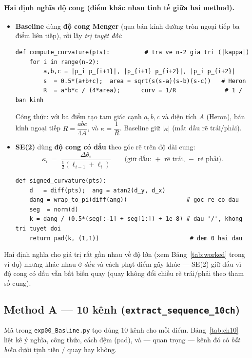 \documentclass[11pt]{article}
\newcommand{\code}[1]{\textcolor{cInk}{\texttt{#1}}}
\newcommand{\fileA}{\code{exp00\_Basline.py}}
\newcommand{\kk}{\kappa}
\theoremstyle{definition}
\newcommand{\chA}[1]{\textcolor{cA}{\textbf{#1}}}
\newcommand{\chB}[1]{\textcolor{cB}{\textbf{#1}}}
\begin{document}
\paragraph{Hai định nghĩa độ cong (điểm khác nhau tinh tế giữa hai method).}
\begin{itemize}[leftmargin=1.4em]
\item \chA{Baseline} dùng \textbf{độ cong Menger} (qua bán kính đường tròn ngoại
tiếp ba điểm liên tiếp), rồi lấy \emph{trị tuyệt đối}:
\begin{lstlisting}
def compute_curvature(pts):          # tra ve n-2 gia tri (|kappa|)
    for i in range(n-2):
        a,b,c = |p_i p_{i+1}|, |p_{i+1} p_{i+2}|, |p_i p_{i+2}|
        s  = 0.5*(a+b+c);  area = sqrt(s(s-a)(s-b)(s-c))   # Heron
        R  = a*b*c / (4*area);      curv = 1/R              # 1 / ban kinh
\end{lstlisting}
Công thức: với ba điểm tạo tam giác cạnh $a,b,c$ và diện tích $A$ (Heron), bán
kính ngoại tiếp $R=\dfrac{abc}{4A}$, và $\kk=\dfrac1R$. Baseline giữ
$|\kk|$ (mất dấu rẽ trái/phải).

\item \chB{SE(2)} dùng \textbf{độ cong có dấu} theo góc rẽ trên độ dài cung:
\begin{equation}
\kk_i \;=\; \frac{\Delta\theta_i}{\tfrac12(\ell_{i-1}+\ell_i)}
\qquad\text{(giữ dấu: $+$ rẽ trái, $-$ rẽ phải).}
\label{eq:signedk}
\end{equation}
\begin{lstlisting}
def signed_curvature(pts):
    d   = diff(pts);  ang = atan2(d_y, d_x)
    dang = wrap_to_pi(diff(ang))                 # goc re co dau
    seg  = norm(d)
    k = dang / (0.5*(seg[:-1] + seg[1:]) + 1e-8) # dau '/', khong tri tuyet doi
    return pad(k, (1,1))                          # dem 0 hai dau
\end{lstlisting}
\end{itemize}
Hai định nghĩa cho giá trị rất gần nhau về độ lớn (xem
Bảng~\ref{tab:worked} trong ví dụ) nhưng khác nhau ở \emph{dấu} và cách phạt
điểm gãy khúc --- SE(2) giữ dấu vì độ cong có dấu vẫn bất biến quay
(quay không đổi chiều rẽ trái/phải theo tham số cung).

\subsection{Method A --- 10 kênh (\code{extract\_sequence\_10ch})}
\label{sec:feat10}
Mã trong \fileA{} tạo đúng 10 kênh cho mỗi điểm. Bảng~\ref{tab:ch10} liệt kê ý
nghĩa, công thức, cách đệm (pad), và --- quan trọng --- kênh đó có \emph{bất
biến} dưới tịnh tiến / quay hay không.
\end{document}
